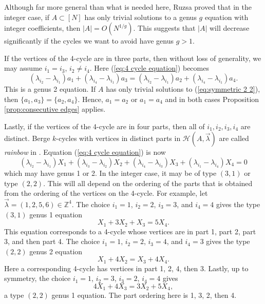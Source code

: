 \documentclass[12pt]{article}%
\begin{document}
Although far more general than what is needed here, Ruzsa \cite{Ruzsa} proved that in the integer case, if $A \subset [N]$ has only trivial solutions to a genus $g$ equation with integer coefficients, then $|A|  = O (N^{1/g})$. 
This suggests that $|A|$ will decrease significantly if the cycles we want to avoid have genus $g > 1$.  

If the vertices of the 4-cycle are in three parts, then without loss of generality, we may assume 
$i_1 = i_3$, $i_2 \neq i_4$.  Here (\ref{eq:4 cycle equation}) becomes
\begin{equation}\label{eq:symmetric 2 2}
( \lambda_{i_2} - \lambda_{i_1} ) a_1 +
( \lambda_{i_4} - \lambda_{i_1} ) a_3 
=
( \lambda_{i_2} - \lambda_{i_1} ) a_2 +
( \lambda_{i_4} - \lambda_{i_1} ) a_4.
\end{equation}
This is a genus 2 equation.  If $A$ has only trivial solutions to (\ref{eq:symmetric 2 2}), then 
$\{a_1 , a_3 \} = \{ a_2  ,a_4 \}$.  
Hence, $a_1 = a_2$ or $a_1 = a_4$ and in both cases 
Proposition \ref{prop:consecutive edges} applies.  

Lastly, if the vertices of the 4-cycle are in four parts,
then all of $i_1,i_2,i_3,i_4$ are distinct.  Berge $k$-cycles with vertices in distinct parts in $\mathcal{H}( A , \vec{ \lambda} )$ are called \emph{rainbow} in \cite{Ge}.  Equation (\ref{eq:4 cycle equation}) is now   
\begin{equation}\label{eq:variables 4 cycle equation}
( \lambda_{i_2} - \lambda_{i_1} ) X_1 + 
( \lambda_{i_3} - \lambda_{i_2} ) X_2 + 
( \lambda_{i_4} - \lambda_{i_3} ) X_3 +
( \lambda_{i_1} - \lambda_{i_4} ) X_4 
=0
\end{equation}
which may have genus 1 or 2.  In the integer case, it may be of type $(3,1)$ or type $(2,2)$.  This will all depend on the ordering of the parts that is obtained from the ordering of the vertices on the 4-cycle.  For example, 
let $\vec{ \lambda} = ( 1,2,5,6) \in \mathbb{Z}^4$.  
The choice $i_1 = 1$, $i_2 = 2$, $i_3 =3$, and $i_4 = 4$ gives the type $(3,1)$ genus 1 equation 
\begin{equation}\label{a Behrend equation}
X_1 + 3X_2 +  X_3 = 5X_4.  
\end{equation}
{This equation corresponds to a 4-cycle whose vertices are in part 1, part 2, part 3, and then part 4.}  
The choice $i_1 = 1$, $i_2 =2$, $i_3 = 4$, and $i_4 = 3$
gives the type $(2,2)$ genus 2 equation 
\begin{equation}\label{a Sidon equation}
X_1 + 4X_2 = X_3 + 4X_4.
\end{equation}
Here a corresponding 4-cycle has vertices in part 1, 2, 4, then 3.
Lastly, up to symmetry, the choice 
$i_1 = 1$, $i_2 = 3$, $i_3 = 2$, $i_4 = 4$ gives
\begin{equation*}
    4X_1 + 4X_3 = 3X_2 + 5X_4,
\end{equation*}
a type $(2,2)$ genus 1 equation.  {The part ordering here is 1, 3, 2, then 4.}  
\end{document}
